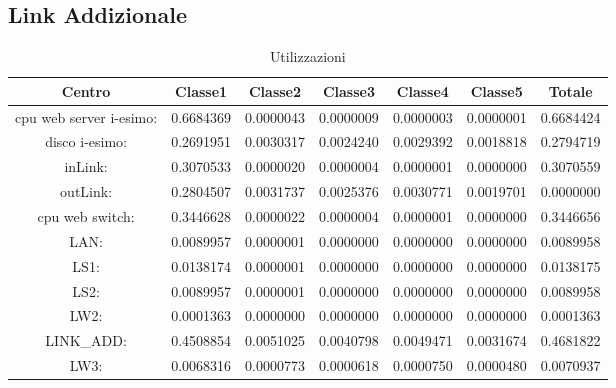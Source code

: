 \subsection{Link Addizionale}
\begin{table}[H]
\begin{center}\begin{scriptsize}
\begin{tabular}{||c|c|c|c|c|c|c||}
\hline
Centro &Classe1 &Classe2 &Classe3 &Classe4 &Classe5 &Totale\\
\hline
\hline
 cpu web server i-esimo: 	&0.6684369	&0.0000043	&0.0000009	&0.0000003	&0.0000001	&0.6684424	\\\hline
 disco i-esimo: 	&0.2691951	&0.0030317	&0.0024240	&0.0029392	&0.0018818	&0.2794719	\\\hline
 inLink: 	&0.3070533	&0.0000020	&0.0000004	&0.0000001	&0.0000000	&0.3070559	\\\hline
 outLink: 	&0.2804507	&0.0031737	&0.0025376	&0.0030771	&0.0019701	&0.0000000	\\\hline
 cpu web switch: 	&0.3446628	&0.0000022	&0.0000004	&0.0000001	&0.0000000	&0.3446656	\\\hline
 LAN: 	&0.0089957	&0.0000001	&0.0000000	&0.0000000	&0.0000000	&0.0089958	\\\hline
 LS1: 	&0.0138174	&0.0000001	&0.0000000	&0.0000000	&0.0000000	&0.0138175	\\\hline
 LS2:	&0.0089957	&0.0000001	&0.0000000	&0.0000000	&0.0000000	&0.0089958	\\\hline
 LW2: 	&0.0001363	&0.0000000	&0.0000000	&0.0000000	&0.0000000	&0.0001363	\\\hline
 LINK\_ADD: 	&0.4508854	&0.0051025	&0.0040798	&0.0049471	&0.0031674	&0.4681822	\\\hline
 LW3: 	&0.0068316	&0.0000773	&0.0000618	&0.0000750	&0.0000480	&0.0070937	\\\hline
\end{tabular}
\end{scriptsize}\end{center}
\caption{Utilizzazioni}
\label{utilizzazioni}
\end{table}

